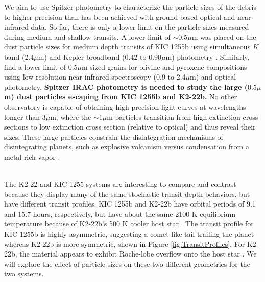 \documentclass[letterpaper,12pt]{article}
\begin{document}
We aim to use Spitzer photometry to characterize the particle sizes of the debris to higher precision than has been achieved with ground-based optical and near-infrared data.
So far, there is only a lower limit on the particle sizes measured during medium and shallow transits.
A lower limit of $\sim$0.5$\mu$m was placed on the dust particle sizes for medium depth transits of KIC 1255b using simultaneous $K$ band (2.4$\mu$m) and Kepler broadband (0.42 to 0.90$\mu$m) photometry \citep{croll2014}.
Similarly, \citet{schlawin2016kic1255} find a lower limit of 0.5$\mu$m sized grains for olivine and pyroxene compositions using low resolution near-infrared spectroscopy (0.9 to 2.4$\mu$m) and optical photometry.
\textbf{Spitzer IRAC photometry is needed to study the large ($0.5\mu$m) dust particles escaping from KIC 1255b and K2-22b.}
No other observatory is capable of obtaining high precision light curves at wavelengths longer than 3$\mu$m, where the $\sim$1$\mu$m  particles transition from high extinction cross sections to low extinction cross section (relative to optical) and thus reveal their sizes.
These large particles constrain the disintegration mechanisms of disintegrating planets, such as explosive volcanism versus condensation from a metal-rich vapor \citep{rappaport}.\newline

%

\\
The K2-22 and KIC 1255 systems are interesting to compare and contrast because they display many of the same stochastic transit depth behaviors, but have different transit profiles.
KIC 1255b and K2-22b have orbital periods of 9.1 and 15.7 hours, respectively, but have about the same 2100 K equilibrium temperature because of K2-22b's  500 K cooler host star \citep{sanchis-ojedak2-22}.
The transit profile for KIC 1255b is highly asymmetric, suggesting a comet-like tail trailing the planet whereas K2-22b is more symmetric, shown in Figure \ref{fig:TransitProfiles}.
For K2-22b, the material appears to exhibit Roche-lobe overflow onto the host star \cite{sanchis-ojedak2-22}.
We will explore the effect of particle sizes on these two different geometries for the two systems.
\newline
\end{document}

